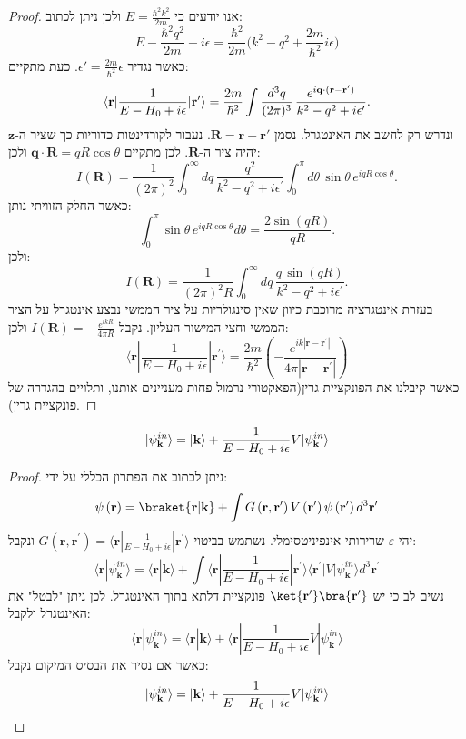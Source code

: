 \documentclass{tstextbook}
\begin{document}
\begin{proof}
אנו יודעים כי \(E=\frac{\hbar^{2}k^{2}}{2m}\) ולכן ניתן לכתוב:
$$E-\frac{\hbar^{2}q^{2}}{2m}+i\epsilon=\frac{\hbar^{2}}{2m}\Big(k^{2}-q^{2}+\frac{2m}{\hbar^{2}}i\epsilon\Big)$$
כאשר נגדיר \(\epsilon'=\frac{2m}{\hbar^{2}}\epsilon\). כעת מתקיים:
$$\langle{\bf r}|\frac{1}{E-H_{0}+i\epsilon}|{\bf r^{\prime}}\rangle=\frac{2m}{\hbar^{2}}\int\frac{d^{3}q}{(2\pi)^{3}}\,\frac{e^{i{\bf q\cdot(r-r^{\prime})}}}{k^{2}-q^{2}+i\epsilon^{\prime}}.$$
ונדרש רק לחשב את האינטגרל. נסמן \(\mathbf{R}=\mathbf{r}-\mathbf{r'}\). נעבור לקורדינטות כדוריות כך שציר ה-\(\mathbf{z}\) יהיה ציר ה-\(\mathbf{R}\). לכן מתקיים \(\mathbf{q}\cdot \mathbf{R}=qR\cos \theta\) ולכן:
$$I(\mathbf{R})={\frac{1}{(2\pi)^{2}}}\int_{0}^{\infty}d q\,{\frac{q^{2}}{k^{2}-q^{2}+i\epsilon^{\prime}}}\int_{0}^{\pi}d\theta\,\sin\theta\,e^{i q R\cos\theta}.$$
כאשר החלק הזוויתי נותן:
$$\int_{0}^{\pi}\sin\theta\,e^{i q R\cos\theta}d\theta=\frac{2\sin(q R)}{q R}.$$
ולכן:
$$I(\mathbf{R})={\frac{1}{(2\pi)^{2}R}}\int_{0}^{\infty}d q\,{\frac{q\,\sin(q R)}{k^{2}-q^{2}+i\epsilon^{\prime}}}.$$
בעזרת אינטגרציה מרוכבת כיוון שאין סינגולריות על ציר הממשי נבצע אינטגרל על הציר הממשי וחצי המישור העליון. נקבל \(I\left( \mathbf{R} \right)=-\frac{e^{ ikR }}{4\pi R}\) ולכן:
$$\langle\mathbf{r}|{\frac{1}{E-H_{0}+i\epsilon}}|\mathbf{r}^{\prime}\rangle={\frac{2m}{\hbar^{2}}}\left(-{\frac{e^{i k|\mathbf{r}-\mathbf{r}^{\prime}|}}{4\pi|\mathbf{r}-\mathbf{r}^{\prime}|}}\right)$$
כאשר קיבלנו את הפונקציית גרין(הפאקטורי נרמול פחות מעניינים אותנו, ותלויים בהגדרה של פונקציית גרין).

\end{proof}
\begin{corollary}
$$|\psi_{\bf k}^{i n}\rangle=|{\bf k}\rangle+\frac{1}{E-H_{0}+i\epsilon}V|\psi_{\bf k}^{i n}\rangle$$

\end{corollary}
\begin{proof}
ניתן לכתוב את הפתרון הכללי על ידי:
$$\psi\left( \mathbf{r} \right)=\braket{ \mathbf{r} | \mathbf{k} } +\int G\left( \mathbf{r},\mathbf{r}^{\prime} \right)V\left( \mathbf{r}^{\prime} \right)\psi\left( \mathbf{r}^{\prime} \right)d^{3}\mathbf{r}^{\prime}$$
יהי \(\varepsilon\) שרירותי אינפיניטסימלי. נשתמש בביטוי \(G(\mathbf{r},\mathbf{r^{\prime}})=\langle\mathbf{r}|{\frac{1}{E-H_{0}+i\epsilon}}|\mathbf{r^{\prime}}\rangle\) ונקבל:
$$\langle\mathbf{r}|\psi_{\mathbf{k}}^{i n}\rangle=\langle\mathbf{r}|\mathbf{k}\rangle+\int\langle\mathbf{r}|{\frac{1}{E-H_{0}+i\epsilon}}|\mathbf{r}^{\prime}\rangle\langle\mathbf{r}^{\prime}|V|\psi_{\mathbf{k}}^{i n}\rangle d^{3}\mathbf{r}^{\prime}$$
נשים לב כי יש \(\ket{\mathbf{r'}}\bra{\mathbf{r'}}\) פונקציית דלתא בתוך האינטגרל. לכן ניתן "לבטל" את האינטגרל ולקבל:
$$\langle\mathbf{r}|\psi_{\mathbf{k}}^{i n}\rangle=\langle\mathbf{r}|\mathbf{k}\rangle+\langle\mathbf{r}|{\frac{1}{E-H_{0}+i\epsilon}}V|\psi_{\mathbf{k}}^{i n}\rangle$$
כאשר אם נסיר את הבסיס המיקום נקבל:
$$|\psi_{\bf k}^{i n}\rangle=|{\bf k}\rangle+\frac{1}{E-H_{0}+i\epsilon}V|\psi_{\bf k}^{i n}\rangle$$

\end{proof}
\end{document}
